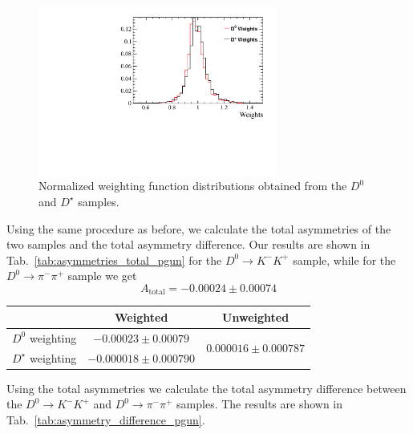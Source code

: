 \documentclass{article}
\begin{document}
        \begin{figure}[h!]
                \centering
                \includegraphics[width = 0.7\textwidth]{../work/RapidSimAnalysis/PGunAnalysis/Plots/Weights.pdf}
                \caption{Normalized weighting function distributions obtained from the $D^0$ and $D^\star$ samples.}
                \label{fig:weightingPgun}
        \end{figure}

        Using the same procedure as before, we calculate the total asymmetries of the two samples and the total asymmetry difference.
        Our results are shown in Tab.~\ref{tab:asymmetries_total_pgun} for the $D^0\to K^-K^+$ sample, while for the $D^0\to\pi^-\pi^+$ sample we get
        \begin{equation}
                A_\text{total} = -0.00024 \pm 0.00074
        \end{equation}
        \begin{center}
                \begin{tabular}{c|c|c}
                        & Weighted & Unweighted\\
                        \hline\hline
                        $D^0$ weighting & $-0.00023 \pm 0.00079$ & \multirow{2}{*}{$0.000016 \pm 0.000787$}\\
                        \cline{1-2}
                        $D^\star$ weighting & $-0.000018 \pm 0.000790$ & \\
                \end{tabular}
                \label{tab:asymmetries_total_pgun}
        \end{center}

        Using the total asymmetries we calculate the total asymmetry difference between the $D^0\to K^-K^+$ and $D^0\to \pi^-\pi^+$ samples.
        The results are shown in Tab.~\ref{tab:asymmetry_difference_pgun}.
\end{document}
